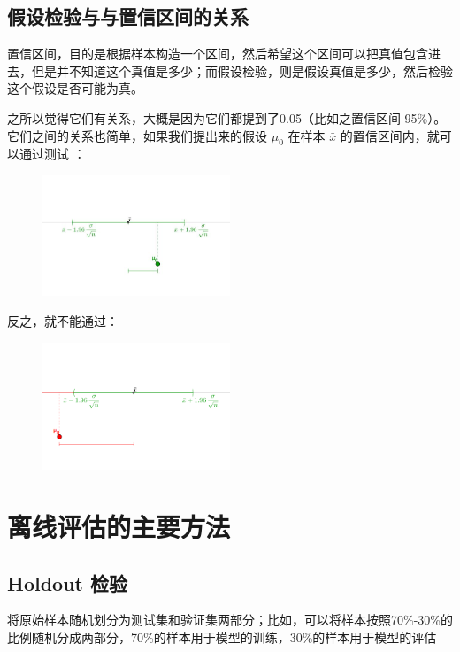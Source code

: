 \documentclass[12pt]{article}
\begin{document}
\subsection{假设检验与与置信区间的关系}
置信区间，目的是根据样本构造一个区间，然后希望这个区间可以把真值包含进去，但是并不知道这个真值是多少；而假设检验，则是假设真值是多少，然后检验这个假设是否可能为真。

之所以觉得它们有关系，大概是因为它们都提到了0.05（比如之置信区间 95\%）。它们之间的关系也简单，如果我们提出来的假设 $\mu_0$ 在样本 $\bar{x}$ 的置信区间内，就可以通过测试
：
\begin{figure}[H]
    \centering
    \includegraphics[width=0.5\textwidth]{fig/P_Value_Confidential_Example_1.jpg}
\end{figure}

反之，就不能通过：
\begin{figure}[H]
    \centering
    \includegraphics[width=0.5\textwidth]{fig/P_Value_Confidential_Example_2.png}
\end{figure}

\section{离线评估的主要方法\cite{Deep_Learning_Recommender_System}}
\subsection{Holdout 检验}
将原始样本随机划分为测试集和验证集两部分；比如，可以将样本按照70\%-30\%的比例随机分成两部分，70\%的样本用于模型的训练，30\%的样本用于模型的评估
\end{document}

